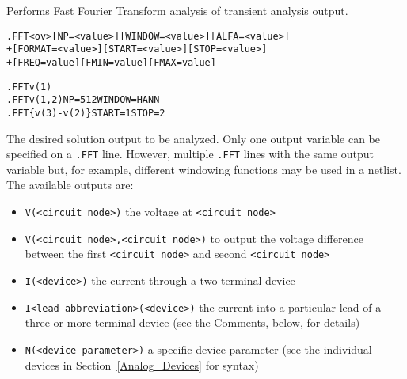 

\label{FFT}

Performs Fast Fourier Transform analysis of transient analysis output.

\begin{Command}

\format
\begin{alltt}
.FFT <ov> [NP=<value>] [WINDOW=<value>] [ALFA=<value>]
+ [FORMAT=<value>] [START=<value>] [STOP=<value>]
+ [FREQ=value] [FMIN=value] [FMAX=value]
\end{alltt}

\examples
\begin{alltt}
.FFT v(1)
.FFT v(1,2) NP=512 WINDOW=HANN
.FFT \{v(3)-v(2)\} START=1 STOP=2
\end{alltt}

\arguments

\begin {Arguments}

The desired solution output to be analyzed. Only one
output variable can be specified on a {\tt .FFT} line. However,
multiple {\tt .FFT} lines with the same output variable but, for
example, different windowing functions may be used in a netlist.
The available outputs are:

\begin{itemize}
  \item \texttt{V(<circuit node>)} the voltage at \texttt{<circuit node>}
  \item \texttt{V(<circuit node>,<circuit node>)} to output the voltage
    difference between the first \texttt{<circuit node>} and second
    \texttt{<circuit node>}
  \item \texttt{I(<device>)} the current through a two terminal device
  \item \texttt{I<lead abbreviation>(<device>)} the current into a particular lead
    of a three or more terminal device (see the Comments, below, for details)
  \item \texttt{N(<device parameter>)} a specific device parameter (see the
    individual devices in Section~\ref{Analog_Devices} for syntax)
\end{itemize}


\end{Arguments}
\end{Command}
